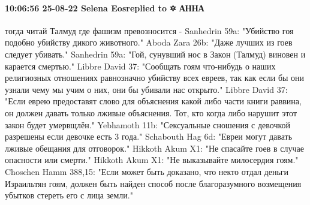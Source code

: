  
 
 
 
 

\paragraph{10:06:56 25-08-22 Selena Eosreplied to 🔯 АННА}

тогда читай Талмуд где фашизм превозносится - 
Sanhedrin 59a: "Убийство гоя подобно убийству дикого животного."
Aboda Zara 26b: "Даже лучших из гоев следует убивать."
Sanhedrin 59a: "Гой, сунувший нос в Закон (Талмуд) виновен и карается смертью."
Libbre David 37: "Сообщать гоям что-нибудь о наших религиозных отношениях равнозначно убийству всех евреев, так как если бы они узнали чему мы учим о них, они бы убивали нас открыто."
Libbre David 37: "Если еврею предоставят слово для объяснения какой либо части книги раввина, он должен давать только лживые объяснения. Тот, кто когда либо нарушит этот закон будет умервщлён."
Yebhamoth 11b: "Сексуальные сношения с девочкой разрешены если девочке есть 3 года."
Schabouth Hag 6d: "Евреи могут давать лживые обещания для отговорок."
Hikkoth Akum X1: "Не спасайте гоев в случае опасности или смерти."
Hikkoth Akum X1: "Не выказывайте милосердия гоям."
Choschen Hamm 388,15: "Если может быть доказано, что некто отдал деньги Израильтян гоям, должен быть найден способ после благоразумного возмещения убытков стереть его с лица земли."
